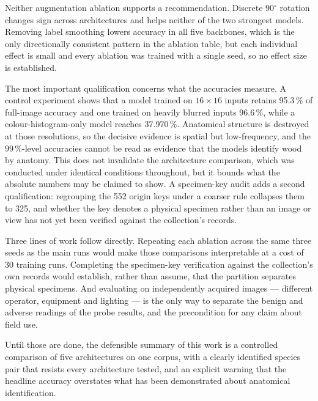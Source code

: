 Neither augmentation ablation supports a recommendation. Discrete
$90^\circ$ rotation changes sign across architectures and helps neither of
the two strongest models. Removing label smoothing lowers accuracy in all
five backbones, which is the only directionally consistent pattern in the
ablation table, but each individual effect is small and every ablation was
trained with a single seed, so no effect size is established.

The most important qualification concerns what the accuracies measure. A
control experiment shows that a model trained on $16\times16$ inputs retains
95.3\,\% of full-image accuracy and one trained on heavily blurred inputs
96.6\,\%, while a colour-histogram-only model reaches 37.970\,\%. Anatomical
structure is destroyed at those resolutions, so the decisive evidence is
spatial but low-frequency, and the $99$\,\%-level accuracies cannot be read
as evidence that the models identify wood by anatomy. This does not
invalidate the architecture comparison, which was conducted under identical
conditions throughout, but it bounds what the absolute numbers may be
claimed to show. A specimen-key audit adds a second qualification: regrouping
the 552 origin keys under a coarser rule collapses them to 325, and whether
the key denotes a physical specimen rather than an image or view has not yet
been verified against the collection's records.

Three lines of work follow directly. Repeating each ablation across the same
three seeds as the main runs would make those comparisons interpretable at a
cost of 30 training runs. Completing the specimen-key verification against
the collection's own records would establish, rather than assume, that the
partition separates physical specimens. And evaluating on independently
acquired images --- different operator, equipment and lighting --- is the
only way to separate the benign and adverse readings of the probe results,
and the precondition for any claim about field use.

Until those are done, the defensible summary of this work is a controlled
comparison of five architectures on one corpus, with a clearly identified
species pair that resists every architecture tested, and an explicit warning
that the headline accuracy overstates what has been demonstrated about
anatomical identification.
